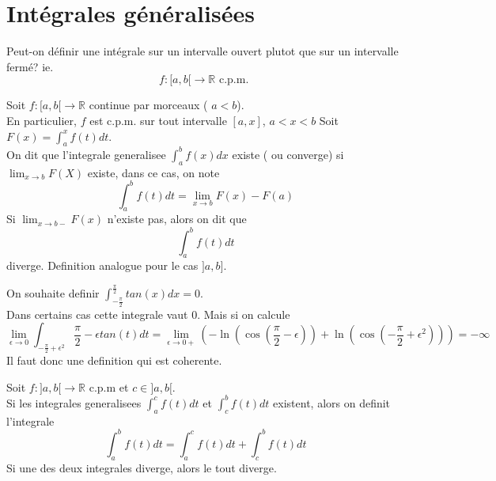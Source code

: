 \documentclass[../main.tex]{subfiles}
\begin{document}
\section{Intégrales généralisées}
Peut-on définir une intégrale sur un intervalle ouvert plutot que sur un intervalle fermé? ie.
\[ 
f: [ a,b[ \to \mathbb{R} \text{ c.p.m. } 
\]
\begin{defn}
	Soit $f:[a,b[ \to \mathbb{R}$ continue par morceaux ( $a <b$).\\
	En particulier, $f$ est c.p.m.  sur tout intervalle $[a,x]$, $a<x<b$
	Soit $F( x)= \int_{ a }^{ x } f( t) dt $.\\
	On dit que l'integrale generalisee $ \int_{ a }^{ b }f( x) dx$ existe ( ou converge) si $ \lim_{x \to b} F( X) $ existe, dans ce cas, on note
	\[ 
		\int_{ a }^{ b }f( t)  dt = \lim_{x \to b} F( x) - F( a) 
	\]
	Si $\lim_{x \to b-} F( x) $ n'existe pas, alors on dit que 
	\[ 
		\int_{ a }^{ b }f( t) dt
	\]
	diverge.
	Definition analogue pour le cas $]a,b]$.
	
\end{defn}
On souhaite definir $ \int_{ -\frac{\pi}{2} }^{ \frac{\pi}{2} } tan( x) dx =0$.\\
Dans certains cas cette integrale vaut 0. Mais si on calcule
\[ 
	\lim_{\epsilon \to  0} \int_{ - \frac{\pi}{2} + \epsilon^{2} }{\frac{\pi}{2}- \epsilon } tan( t) dt = \lim_{\epsilon  \to 0+} ( - \ln ( \cos ( \frac{\pi}{2}-\epsilon) ) + \ln( \cos( - \frac{\pi}{2}+ \epsilon^{2}) ) ) = - \infty 
\]
Il faut donc une definition qui est coherente.
\begin{defn}
	Soit $f:]a,b[\to \mathbb{R}$ c.p.m et $c \in ]a,b[$.\\
	Si les integrales generalisees $ \int_{ a }^{ c }f( t) dt$ et $ \int_{ c }^{ b }f( t) dt$ existent, alors on definit l'integrale 
	\[ 
		\int_{ a }^{ b }f( t) dt = \int_{ a }^{ c }f( t) dt + \int_{ c }^{ b }f( t) dt
	\]
	Si une des deux integrales diverge, alors le tout diverge.
\end{defn}
\end{document}
